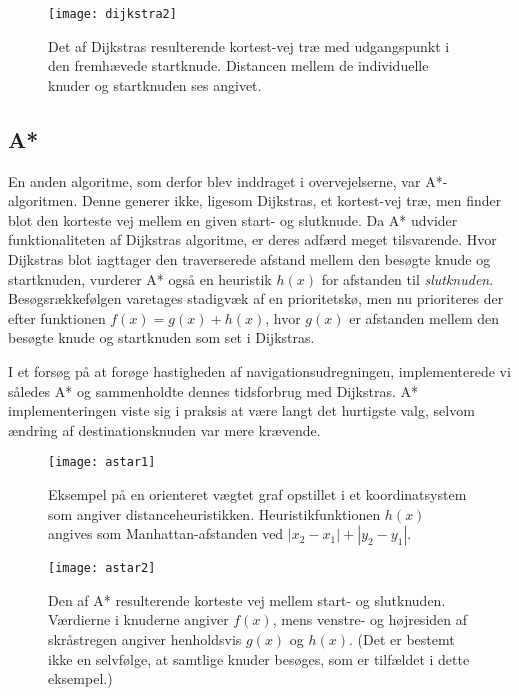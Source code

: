\begin{figure}[ht]
	\centering
  \texttt{[image: dijkstra2]}
  \captionsetup{width=0.8\textwidth}
  \caption{Det af Dijkstras resulterende kortest-vej træ med udgangspunkt i den fremhævede startknude. Distancen mellem de individuelle knuder og startknuden ses angivet.}
  \label{fig:dijkstra2}
\end{figure}

\subsection{A*}
\label{subsec:astar}
En anden algoritme, som derfor blev inddraget i overvejelserne, var A*-algoritmen. Denne generer ikke, ligesom Dijkstras, et kortest-vej træ, men finder blot den korteste vej mellem en given start- og slutknude. Da A* udvider funktionaliteten af Dijkstras algoritme, er deres adfærd meget tilsvarende. Hvor Dijkstras blot iagttager den traverserede afstand mellem den besøgte knude og startknuden, vurderer A* også en heuristik $h(x)$ for afstanden til \emph{slutknuden}. Besøgsrækkefølgen varetages stadigvæk af en prioritetskø, men nu prioriteres der efter funktionen $f(x)=g(x)+h(x)$, hvor $g(x)$ er afstanden mellem den besøgte knude og startknuden som set i Dijkstras.

I et forsøg på at forøge hastigheden af navigationsudregningen, implementerede vi således A* og sammenholdte dennes tidsforbrug med Dijkstras. A* implementeringen viste sig i praksis at være langt det hurtigste valg, selvom ændring af destinationsknuden var mere krævende.

\begin{figure}[ht]
	\centering
  \texttt{[image: astar1]}
  \captionsetup{width=0.8\textwidth}
	\caption{Eksempel på en orienteret vægtet graf opstillet i et koordinatsystem som angiver distanceheuristikken. Heuristikfunktionen $h(x)$ angives som Manhattan-afstanden ved $|x_2-x_1|+|y_2-y_1|$.}
  \label{fig:astar1}
\end{figure}

\begin{figure}[ht]
	\centering
  \texttt{[image: astar2]}
  \captionsetup{width=0.8\textwidth}
	\caption{Den af A* resulterende korteste vej mellem start- og slutknuden. Værdierne i knuderne angiver $f(x)$, mens venstre- og højresiden af skråstregen angiver henholdsvis $g(x)$ og $h(x)$. (Det er bestemt ikke en selvfølge, at samtlige knuder besøges, som er tilfældet i dette eksempel.)}
  \label{fig:astar2}
\end{figure}

